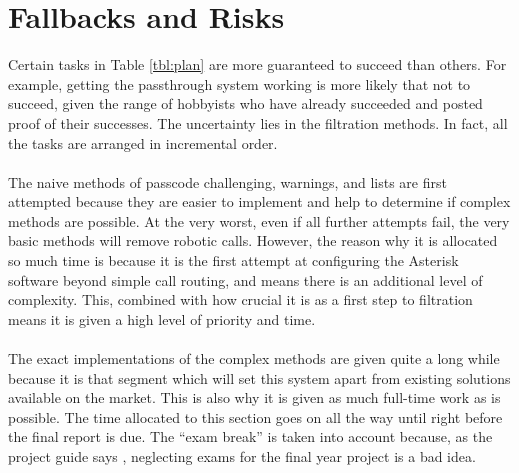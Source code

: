 \documentclass[main.tex]{subfiles}
\begin{document}
\section{Fallbacks and Risks}
Certain tasks in Table \ref{tbl:plan} are more guaranteed to succeed than others. For example, getting the passthrough system working is more likely that not to succeed, given the range of hobbyists who have already succeeded and posted proof of their successes. The uncertainty lies in the filtration methods. In fact, all the tasks are arranged in incremental order.
\\\\
The naive methods of passcode challenging, warnings, and lists are first attempted because they are easier to implement and help to determine if complex methods are possible. At the very worst, even if all further attempts fail, the very basic methods will remove robotic calls. However, the reason why it is allocated so much time is because it is the first attempt at configuring the Asterisk software beyond simple call routing, and means there is an additional level of complexity. This, combined with how crucial it is as a first step to filtration means it is given a high level of priority and time.
\\\\
The exact implementations of the complex methods are given quite a long while because it is that segment which will set this system apart from existing solutions available on the market. This is also why it is given as much full-time work as is possible. The time allocated to this section goes on all the way until right before the final report is due. The ``exam break'' is taken into account because, as the project guide says \cite{guide}, neglecting exams for the final year project is a bad idea.
\end{document}
